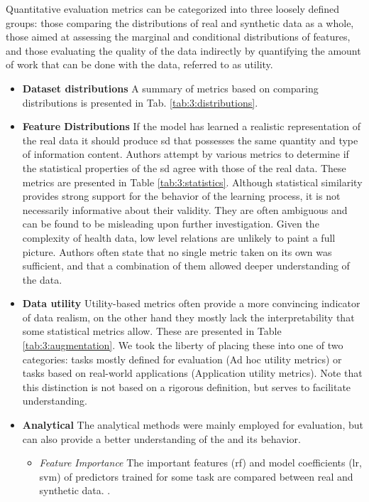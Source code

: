             Quantitative evaluation metrics can be categorized into three loosely defined groups: those comparing the distributions of real and synthetic data as a whole, those aimed at assessing the marginal and conditional distributions of features, and those evaluating the quality of the data indirectly by quantifying the amount of work that can be done with the data, referred to as utility.
            
            \begin{itemize}
                \item \textbf{Dataset distributions}
                A summary of metrics based on comparing distributions is presented in Tab. \ref{tab:3:distributions}.
                \item \textbf{Feature Distributions}
                If the model has learned a realistic representation of the real data it should produce \gls{sd} that possesses the same quantity and type of information content. Authors attempt by various metrics to determine if the statistical properties of the \gls{sd} agree with those of the real data. These metrics are presented in Table \ref{tab:3:statistics}. Although statistical similarity provides strong support for the behavior of the learning process, it is not necessarily informative about their validity. They are often ambiguous and can be found to be misleading upon further investigation. Given the complexity of health data, low level relations are unlikely to paint a full picture. Authors often state that no single metric taken on its own was sufficient, and that a combination of them allowed deeper understanding of the data.
                \item \textbf{Data utility}
                 Utility-based metrics often provide a more convincing indicator of data realism, on the other hand they mostly lack the interpretability that some statistical metrics allow. These are presented in Table \ref{tab:3:augmentation}. We took the liberty of placing these into one of two categories: tasks mostly defined for evaluation (Ad hoc utility metrics) or tasks based on real-world applications (Application utility metrics). Note that this distinction is not based on a rigorous definition, but serves to facilitate understanding.
                \item \textbf{Analytical} The analytical methods were mainly employed for evaluation, but can also provide a better understanding of the and its behavior.
                \begin{itemize}
                    \item \textsl{Feature Importance} The important features (\gls{rf}) and model coefficients (\gls{lr}, \gls{svm}) of predictors trained for some task are compared between real and synthetic data. \cite{esteban2017real,Xu2019-ay,Yoon2020-anon,chin2019generation, Beaulieu-Jones2019-ct}.

\end{itemize}
\end{itemize}

